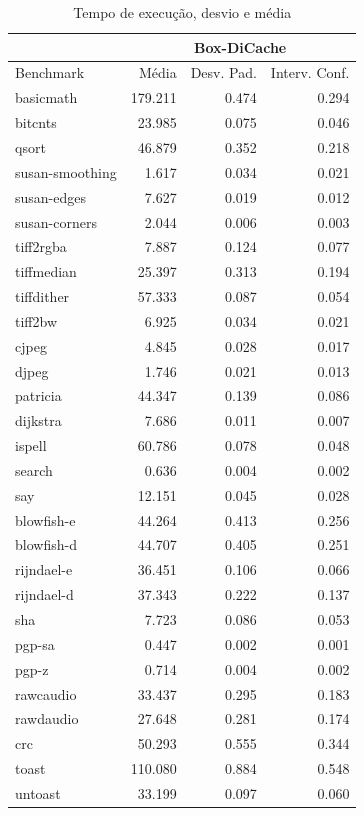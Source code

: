 \documentclass[11pt,twoside]{article}
\begin{document}
\begin{table}
 \caption{Tempo de execução, desvio e média}
 \begin{center}
 \begin{tabular}{|l|r|r|r|}
   \cline{2-4}
   \multicolumn{1}{c|}{}& \multicolumn{3}{|c|}{Box-DiCache} \\ \hline
   Benchmark & Média & Desv. Pad. & Interv. Conf.\\ \hline 
   basicmath & 179.211 & 0.474 & 0.294\\ \hline 
   bitcnts & 23.985 & 0.075 & 0.046\\ \hline 
   qsort & 46.879 & 0.352 & 0.218\\ \hline 
   susan-smoothing & 1.617 & 0.034 & 0.021\\ \hline 
   susan-edges & 7.627 & 0.019 & 0.012\\ \hline 
   susan-corners & 2.044 & 0.006 & 0.003\\ \hline 
   tiff2rgba & 7.887 & 0.124 & 0.077\\ \hline 
   tiffmedian & 25.397 & 0.313 & 0.194\\ \hline 
   tiffdither & 57.333 & 0.087 & 0.054\\ \hline 
   tiff2bw & 6.925 & 0.034 & 0.021\\ \hline 
   cjpeg & 4.845 & 0.028 & 0.017\\ \hline 
   djpeg & 1.746 & 0.021 & 0.013\\ \hline 
   patricia & 44.347 & 0.139 & 0.086\\ \hline 
   dijkstra & 7.686 & 0.011 & 0.007\\ \hline 
   ispell & 60.786 & 0.078 & 0.048\\ \hline 
   search & 0.636 & 0.004 & 0.002\\ \hline 
   say & 12.151 & 0.045 & 0.028\\ \hline 
   blowfish-e & 44.264 & 0.413 & 0.256\\ \hline 
   blowfish-d & 44.707 & 0.405 & 0.251\\ \hline 
   rijndael-e & 36.451 & 0.106 & 0.066\\ \hline 
   rijndael-d & 37.343 & 0.222 & 0.137\\ \hline 
   sha & 7.723 & 0.086 & 0.053\\ \hline 
   pgp-sa & 0.447 & 0.002 & 0.001\\ \hline 
   pgp-z & 0.714 & 0.004 & 0.002\\ \hline 
   rawcaudio & 33.437 & 0.295 & 0.183\\ \hline 
   rawdaudio & 27.648 & 0.281 & 0.174\\ \hline 
   crc & 50.293 & 0.555 & 0.344\\ \hline 
   toast & 110.080 & 0.884 & 0.548\\ \hline 
   untoast & 33.199 & 0.097 & 0.060\\
   \hline
  \end{tabular}
  \label{tab:tempos_boxdicache}
 \end{center}
\end{table}
 
\end{document}
